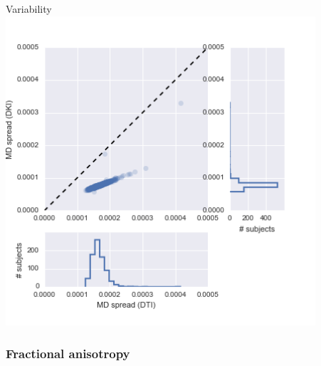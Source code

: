 \documentclass[a0, landscape]{a0poster}
\begin{document}
\begin{multicols}{3}
\begin{minipage}[b]{1\linewidth}
\begin{minipage}[b]{0.33\linewidth}
  \end{minipage}
  \begin{minipage}[b]{0.33\linewidth}
    \center Variability\\
  \includegraphics[width=11.5cm]{md_spread.png}
  \end{minipage}
\end{minipage}

\subsubsection*{Fractional anisotropy}


\end{multicols}
\end{document}
